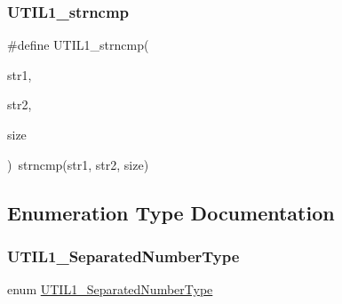 \subsubsection{\texorpdfstring{U\+T\+I\+L1\+\_\+strncmp}{UTIL1\_strncmp}}
{\footnotesize\ttfamily \#define U\+T\+I\+L1\+\_\+strncmp(\begin{DoxyParamCaption}\item[{}]{str1,  }\item[{}]{str2,  }\item[{}]{size }\end{DoxyParamCaption})~strncmp(str1, str2, size)}



\subsection{Enumeration Type Documentation}
\mbox{\label{group___u_t_i_l1__module_gac119fea18ee711120d44fe056b99b364}} 
\subsubsection{\texorpdfstring{U\+T\+I\+L1\+\_\+\+Separated\+Number\+Type}{UTIL1\_SeparatedNumberType}}
{\footnotesize\ttfamily enum \hyperlink{group___u_t_i_l1__module_gac119fea18ee711120d44fe056b99b364}{U\+T\+I\+L1\+\_\+\+Separated\+Number\+Type}}

